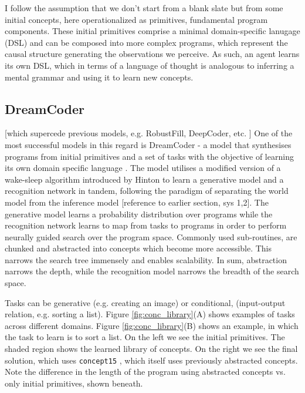 I follow the assumption that we don't start from a blank slate but from some initial concepts, here operationalized as primitives, fundamental program components. These initial primitives comprise a minimal domain-specific lanugage (DSL) and can be composed into more complex programs, which represent the causal structure generating the observations we perceive. As such, an agent learns its own DSL, which in terms of a language of thought is analogous to inferring a mental grammar and using it to learn new concepts.


\subsection{DreamCoder}
[which supercede previous models, e.g. RobustFill, DeepCoder, etc. ]
One of the most successful models in this regard is DreamCoder - a model that synthesises programs from initial primitives and a set of tasks with the objective of learning its own domain specific language \cite{ellis_dreamcoder_2021}. The model utilises a modified version of a wake-sleep algorithm introduced by Hinton to learn a generative model and a recognition network in tandem, following the paradigm of separating the world model from the inference model \cite{hinton1995wake} [reference to earlier section, sys 1,2]. The generative model learns a probability distribution over programs while the recognition network learns to map from tasks to programs in order to perform neurally guided search over the program space.
Commonly used sub-routines, are chunked and abstracted into concepts which become more accessible. This narrows the search tree immensely and enables scalability. In sum, abstraction narrows the depth, while the recognition model narrows the breadth of the search space.

Tasks can be generative (e.g. creating an image) or conditional, (input-output relation, e.g. sorting a list).
Figure \ref{fig:conc_library}(A) shows examples of tasks across different domains. 
Figure \ref{fig:conc_library}(B) shows an example, in which the task to learn is to sort a list. On the left we see the initial primitives. The shaded region shows the learned library of concepts. On the right we see the final solution, which uses \texttt{concept15} , which itself uses previously abstracted concepts. Note the difference in the length of the program using abstracted concepts vs. only initial primitives, shown beneath.

